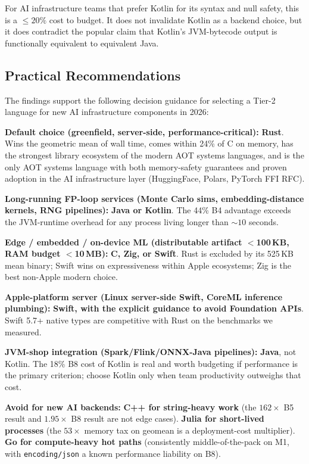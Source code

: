 \documentclass[10pt,conference]{IEEEtran}
\begin{document}
For AI infrastructure teams that prefer Kotlin for its
syntax and null safety, this is a $\leq 20\%$ cost to budget. It
does not invalidate Kotlin as a backend choice, but it does
contradict the popular claim that Kotlin's JVM-bytecode output
is functionally equivalent to equivalent Java.

\subsection{Practical Recommendations}
\label{sec:disc-rec}

The findings support the following decision guidance for
selecting a Tier-2 language for new AI infrastructure components
in 2026:

\textbf{Default choice (greenfield, server-side, performance-critical):}
\textbf{Rust}. Wins the geometric mean of wall time, comes within
24\% of C on memory, has the strongest library ecosystem of the
modern AOT systems languages, and is the only AOT systems
language with both memory-safety guarantees and proven adoption in
the AI infrastructure layer (HuggingFace, Polars, PyTorch FFI
RFC).

\textbf{Long-running FP-loop services (Monte Carlo sims,
embedding-distance kernels, RNG pipelines):} \textbf{Java or
Kotlin}. The 44\% B4 advantage exceeds the JVM-runtime overhead
for any process living longer than $\sim 10$ seconds.

\textbf{Edge / embedded / on-device ML (distributable artifact
$<$100\,KB, RAM budget $<$10\,MB):} \textbf{C, Zig, or Swift}.
Rust is excluded by its 525\,KB mean binary; Swift wins on
expressiveness within Apple ecosystems; Zig is the best
non-Apple modern choice.

\textbf{Apple-platform server (Linux server-side Swift, CoreML
inference plumbing):} \textbf{Swift, with the explicit guidance
to avoid Foundation APIs}. Swift 5.7+ native types are competitive
with Rust on the benchmarks we measured.

\textbf{JVM-shop integration (Spark/Flink/ONNX-Java pipelines):}
\textbf{Java}, not Kotlin. The 18\% B8 cost of Kotlin is real and
worth budgeting if performance is the primary criterion; choose
Kotlin only when team productivity outweighs that cost.

\textbf{Avoid for new AI backends:} \textbf{C++ for string-heavy
work} (the $162\times$ B5 result and $1.95\times$ B8 result are
not edge cases). \textbf{Julia for short-lived processes} (the
$53\times$ memory tax on geomean is a deployment-cost
multiplier). \textbf{Go for compute-heavy hot paths}
(consistently middle-of-the-pack on M1, with
\texttt{encoding/json} a known performance liability on B8).
\end{document}

